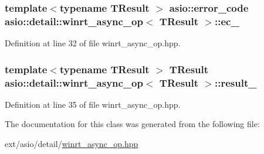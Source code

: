 \subsubsection[{ec\+\_\+}]{\setlength{\rightskip}{0pt plus 5cm}template$<$typename T\+Result $>$ {\bf asio\+::error\+\_\+code} {\bf asio\+::detail\+::winrt\+\_\+async\+\_\+op}$<$ T\+Result $>$\+::ec\+\_\+}\label{classasio_1_1detail_1_1winrt__async__op_a4b60f8bff9a9aa62182aca303d4e7ecd}


Definition at line 32 of file winrt\+\_\+async\+\_\+op.\+hpp.

\hypertarget{classasio_1_1detail_1_1winrt__async__op_a7a3a44d2ff57632838036a8c279a7a65}{}
\subsubsection[{result\+\_\+}]{\setlength{\rightskip}{0pt plus 5cm}template$<$typename T\+Result $>$ T\+Result {\bf asio\+::detail\+::winrt\+\_\+async\+\_\+op}$<$ T\+Result $>$\+::result\+\_\+}\label{classasio_1_1detail_1_1winrt__async__op_a7a3a44d2ff57632838036a8c279a7a65}


Definition at line 35 of file winrt\+\_\+async\+\_\+op.\+hpp.



The documentation for this class was generated from the following file\+:\begin{DoxyCompactItemize}
\item 
ext/asio/detail/\hyperlink{winrt__async__op_8hpp}{winrt\+\_\+async\+\_\+op.\+hpp}\end{DoxyCompactItemize}
